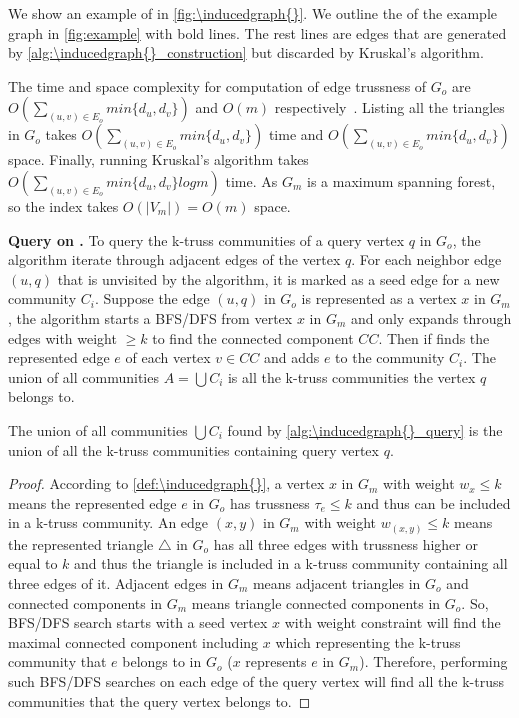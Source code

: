We show an example of \inducedgraph{} in \autoref{fig:\inducedgraph{}}. We outline the \inducedgraph{} of the example graph in \autoref{fig:example} with bold lines. The rest lines are edges that are generated by \autoref{alg:\inducedgraph{}_construction} but discarded by Kruskal's algorithm. 

The time and space complexity for computation of edge trussness of $G_o$ are $O(\sum_{(u,v) \in E_{o}}{min\{d_{u},d_{v}\}})$ and $O(m)$ respectively~\cite{huang2014querying}. Listing all the triangles in $G_o$ takes $O(\sum_{(u,v) \in E_{o}}{min\{d_{u},d_{v}\}})$ time and $O(\sum_{(u,v) \in E_{o}}{min\{d_{u},d_{v}\}})$ space. Finally, running Kruskal's algorithm takes $O(\sum_{(u,v) \in E_{o}}{min\{d_{u},d_{v}\}}log{m})$ time. As $G_m$ is a maximum spanning forest, so the \inducedgraph{} index takes $O(|V_m|) = O(m)$ space.

\vskip 0.1in \noindent \textbf{Query on \InducedGraph{}.} To query the k-truss communities of a query vertex $q$ in $G_o$, the algorithm iterate through adjacent edges of the vertex $q$. For each neighbor edge $(u,q)$ that is unvisited by the algorithm, it is marked as a seed edge for a new community $C_i$. Suppose the edge $(u,q)$ in $G_o$ is represented as a vertex $x$ in $G_m$, the algorithm starts a BFS/DFS from vertex $x$ in $G_m$ and only expands through edges with weight $\ge k$ to find the connected component $CC$. Then if finds the represented edge $e$ of each vertex $v \in CC$ and adds $e$ to the community $C_i$. The union of all communities $A = \bigcup C_i$ is all the k-truss communities the vertex $q$ belongs to.

\begin{Thm}
The union of all communities $\bigcup C_i$ found by \autoref{alg:\inducedgraph{}_query} is the union of all the k-truss communities containing query vertex $q$.
\label{thm:\inducedgraph{}_query}
\end{Thm}

\begin{proof}
According to \autoref{def:\inducedgraph{}}, a vertex $x$ in \inducedgraph{} $G_m$ with weight $w_{x} \le k$ means the represented edge $e$ in $G_o$ has trussness $\tau_{e} \le k$ and thus can be included in a k-truss community. An edge $(x,y)$ in \inducedgraph{} $G_m$ with weight $w_{(x,y)} \le k$ means the represented triangle $\triangle$ in $G_o$ has all three edges with trussness higher or equal to $k$ and thus the triangle is included in a k-truss community containing all three edges of it. Adjacent edges in $G_m$ means adjacent triangles in $G_o$ and connected components in $G_m$ means triangle connected components in $G_o$. So, BFS/DFS search starts with a seed vertex $x$ with weight constraint will find the maximal connected component including $x$ which representing the k-truss community that $e$ belongs to in $G_o$ ($x$ represents $e$ in $G_m$). Therefore, performing such BFS/DFS searches on each edge of the query vertex will find all the k-truss communities that the query vertex belongs to.
\end{proof}


